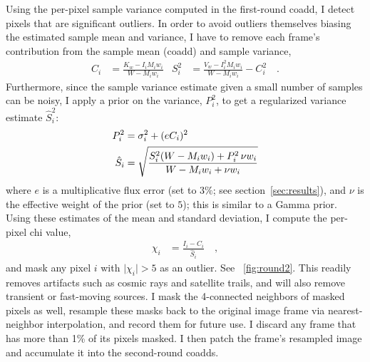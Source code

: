 \documentclass[11pt,preprint]{aastex}
\newcommand{\figref}[1]{\figurename~\ref{#1}}
\newcommand{\secref}[1]{section~\ref{#1}}
\newcommand{\fimg}[1]{#1}
\newcommand{\img}{\fimg{I}}
\newcommand{\wt}{w}
\newcommand{\mask}{\fimg{M}}
\newcommand{\covar}{\fimg{V}}
\newcommand{\coacc}{\fimg{K}}
\newcommand{\coadd}{\fimg{C}}
\newcommand{\cowt}{\fimg{W}}
\newcommand{\ppchi}{\fimg{\chi}}
\newcommand{\copp}{\fimg{S}}
\newcommand{\sigprior}{\fimg{P}}
\newcommand{\nprior}{\nu}
\newcommand{\fluxsys}{e}
\newcommand{\abs}[1]{\lvert#1\rvert}
\begin{document}
Using the per-pixel sample variance computed in the first-round coadd,
I detect pixels that are significant outliers.  In order to avoid
outliers themselves biasing the estimated sample mean and variance, I
have to remove each frame's contribution from the sample mean (coadd)
and sample variance,
\begin{align}
\coadd_i  &= \frac{\coacc_w - \img_i   \mask_i \wt_i}{\cowt - \mask_i \wt_i}
&
\copp_i^2 &= \frac{\covar_w - \img_i^2 \mask_i \wt_i}{\cowt - \mask_i \wt_i} - \coadd_i^2%
 \quad .
\end{align}
Furthermore, since the sample variance estimate given a small number
of samples can be noisy, I apply a prior on the variance,
$\sigprior_i^2$, to get a regularized variance estimate $\hat{\copp}_i^2$:
\begin{align}
\sigprior_i^2 &= \sigma_i^2 + (\fluxsys \coadd_i)^2 \\
\hat{\copp}_i &= \sqrt{%
  \frac{\copp_i^2 (W - \mask_i \wt_i) + \sigprior_i^2 \, \nprior \wt_i}%
       {W - \mask_i \wt_i + \nprior \wt_i}%
       }
\end{align}
where $\fluxsys$ is a multiplicative flux error (set to $3\%$; see
\secref{sec:results}), and $\nprior$ is the effective weight of the
prior (set to $5$); this is similar to a Gamma prior.
%
Using these estimates of the mean and standard deviation, I compute
the per-pixel chi value,
\begin{align}
\ppchi_i &= \frac{\img_i - \coadd_i}{\hat{\copp}_i} \quad ,
\end{align}
and mask any pixel $i$ with $\abs{\ppchi_i} > 5$ as an outlier.  See
\figref{fig:round2}.  This readily removes artifacts such as cosmic
rays and satellite trails, and will also remove transient or
fast-moving sources.  I mask the 4-connected neighbors of masked
pixels as well, resample these masks back to the original image frame
via nearest-neighbor interpolation, and record them for future use.  I
discard any frame that has more than 1\% of its pixels masked.  I then
patch the frame's resampled image and accumulate it into the
second-round coadds.
\end{document}
